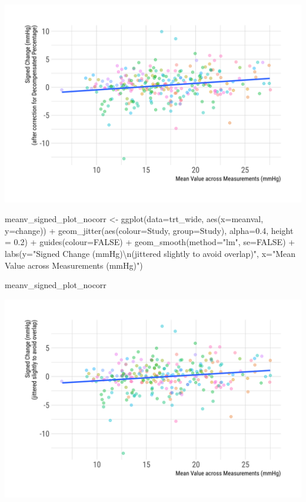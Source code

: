 \documentclass[
]{article}
\newenvironment{Shaded}{\begin{snugshade}}{\end{snugshade}}
\newcommand{\AttributeTok}[1]{\textcolor[rgb]{0.77,0.63,0.00}{#1}}
\newcommand{\ConstantTok}[1]{\textcolor[rgb]{0.00,0.00,0.00}{#1}}
\newcommand{\FloatTok}[1]{\textcolor[rgb]{0.00,0.00,0.81}{#1}}
\newcommand{\FunctionTok}[1]{\textcolor[rgb]{0.00,0.00,0.00}{#1}}
\newcommand{\NormalTok}[1]{#1}
\newcommand{\OtherTok}[1]{\textcolor[rgb]{0.56,0.35,0.01}{#1}}
\newcommand{\SpecialCharTok}[1]{\textcolor[rgb]{0.00,0.00,0.00}{#1}}
\newcommand{\StringTok}[1]{\textcolor[rgb]{0.31,0.60,0.02}{#1}}
\begin{document}
\includegraphics{figures/unnamed-chunk-48-1.png}

\begin{Shaded}
\begin{Highlighting}[]
\NormalTok{meanv\_signed\_plot\_nocorr }\OtherTok{\textless{}{-}} \FunctionTok{ggplot}\NormalTok{(}\AttributeTok{data=}\NormalTok{trt\_wide, }\FunctionTok{aes}\NormalTok{(}\AttributeTok{x=}\NormalTok{meanval, }\AttributeTok{y=}\NormalTok{change)) }\SpecialCharTok{+}
  \FunctionTok{geom\_jitter}\NormalTok{(}\FunctionTok{aes}\NormalTok{(}\AttributeTok{colour=}\NormalTok{Study, }\AttributeTok{group=}\NormalTok{Study), }\AttributeTok{alpha=}\FloatTok{0.4}\NormalTok{, }\AttributeTok{height =} \FloatTok{0.2}\NormalTok{) }\SpecialCharTok{+}
  \FunctionTok{guides}\NormalTok{(}\AttributeTok{colour=}\ConstantTok{FALSE}\NormalTok{) }\SpecialCharTok{+} 
  \FunctionTok{geom\_smooth}\NormalTok{(}\AttributeTok{method=}\StringTok{"lm"}\NormalTok{, }\AttributeTok{se=}\ConstantTok{FALSE}\NormalTok{) }\SpecialCharTok{+}
  \FunctionTok{labs}\NormalTok{(}\AttributeTok{y=}\StringTok{"Signed Change (mmHg)}\SpecialCharTok{\textbackslash{}n}\StringTok{(jittered slightly to avoid overlap)"}\NormalTok{,}
       \AttributeTok{x=}\StringTok{"Mean Value across Measurements (mmHg)"}\NormalTok{)}

\NormalTok{meanv\_signed\_plot\_nocorr}
\end{Highlighting}
\end{Shaded}

\includegraphics{figures/unnamed-chunk-49-1.png}
\end{document}
